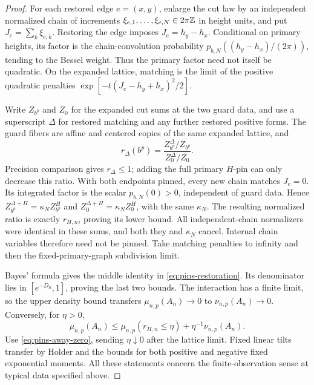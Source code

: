 \begin{proof}
For each restored edge \(e=(x,y)\), enlarge the cut
law by an independent normalized chain of increments
\(\xi_{e,1},\ldots,\xi_{e,N}\in2\pi\mathbb Z\) in height units, and put
\(J_e=\sum_k\xi_{e,k}\). Restoring the edge imposes
\(J_e=h_y-h_x\). Conditional on primary heights, its
factor is the chain-convolution probability
\(p_{b,N}((h_y-h_x)/(2\pi))\), tending to the Bessel
weight. Thus the primary factor need not itself be
quadratic. On the expanded lattice, matching is the
limit of the positive quadratic penalties
\(\exp[-t(J_e-h_y+h_x)^2/2]\).

Write \(Z_{b^p}\) and \(Z_0\) for the expanded cut
sums at the two guard data, and use a superscript
\(\Delta\) for restored matching and any further
restored positive forms. The guard fibers are affine
and centered copies of the same expanded lattice, and
\[
 r_\Delta(b^p)=
       \frac{Z_{b^p}^{\Delta}/Z_{b^p}}
            {Z_0^{\Delta}/Z_0}.
\]
Precision comparison gives \(r_\Delta\le1\);
adding the full primary \(H\)-pin can only decrease
this ratio. With both endpoints pinned, every new
chain matches \(J_e=0\). Its integrated factor is
the scalar \(p_{b,N}(0)>0\), independent of guard
data. Hence
\(Z_{b^p}^{\Delta+H}=\kappa_N Z_{b^p}^{H}\)
and \(Z_0^{\Delta+H}=\kappa_N Z_0^{H}\), with the
same \(\kappa_N\). The resulting normalized ratio is
exactly \(r_{H,n}\), proving its lower bound.
All independent-chain normalizers were identical in
these sums, and both they and \(\kappa_N\) cancel.
Internal chain variables therefore need not be pinned.
Take matching penalties to infinity and then the
fixed-primary-graph subdivision limit.

Bayes' formula gives the middle identity in
\eqref{eq:pins-restoration}. Its denominator lies
in \([e^{-D_n},1]\), proving the last two bounds.
The interaction has a finite limit, so the upper
density bound transfers \(\mu_{n,p}(A_n)\to0\)
to \(\nu_{n,p}(A_n)\to0\). Conversely, for \(\eta>0\),
\[
 \mu_{n,p}(A_n)
 \le\mu_{n,p}(r_{H,n}\le\eta)
                       +\eta^{-1}\nu_{n,p}(A_n).
\]
Use \eqref{eq:pins-away-zero}, sending \(\eta\downarrow0\)
after the lattice limit. Fixed linear tilts transfer
by Holder and the bounds for both positive and
negative fixed exponential moments. All these
statements concern the finite-observation sense at
typical data specified above.
\end{proof}
